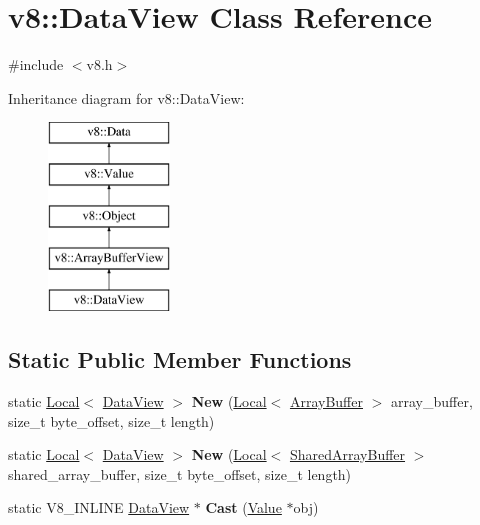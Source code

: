 \hypertarget{classv8_1_1_data_view}{}\section{v8\+:\+:Data\+View Class Reference}
\label{classv8_1_1_data_view}


{\ttfamily \#include $<$v8.\+h$>$}

Inheritance diagram for v8\+:\+:Data\+View\+:\begin{figure}[H]
\begin{center}
\leavevmode
\includegraphics[height=5.000000cm]{classv8_1_1_data_view}
\end{center}
\end{figure}
\subsection*{Static Public Member Functions}
\begin{DoxyCompactItemize}
\item 
static \hyperlink{classv8_1_1_local}{Local}$<$ \hyperlink{classv8_1_1_data_view}{Data\+View} $>$ {\bfseries New} (\hyperlink{classv8_1_1_local}{Local}$<$ \hyperlink{classv8_1_1_array_buffer}{Array\+Buffer} $>$ array\+\_\+buffer, size\+\_\+t byte\+\_\+offset, size\+\_\+t length)\hypertarget{classv8_1_1_data_view_a40dcfc9ed56dbc41f48ddc49271cbab0}{}\label{classv8_1_1_data_view_a40dcfc9ed56dbc41f48ddc49271cbab0}

\item 
static \hyperlink{classv8_1_1_local}{Local}$<$ \hyperlink{classv8_1_1_data_view}{Data\+View} $>$ {\bfseries New} (\hyperlink{classv8_1_1_local}{Local}$<$ \hyperlink{classv8_1_1_shared_array_buffer}{Shared\+Array\+Buffer} $>$ shared\+\_\+array\+\_\+buffer, size\+\_\+t byte\+\_\+offset, size\+\_\+t length)\hypertarget{classv8_1_1_data_view_a8310e075564dd9f26122be2733995ba2}{}\label{classv8_1_1_data_view_a8310e075564dd9f26122be2733995ba2}

\item 
static V8\+\_\+\+I\+N\+L\+I\+NE \hyperlink{classv8_1_1_data_view}{Data\+View} $\ast$ {\bfseries Cast} (\hyperlink{classv8_1_1_value}{Value} $\ast$obj)\hypertarget{classv8_1_1_data_view_aa97d15fcb28c6c002a52d32877c8fd3a}{}\label{classv8_1_1_data_view_aa97d15fcb28c6c002a52d32877c8fd3a}

\end{DoxyCompactItemize}
